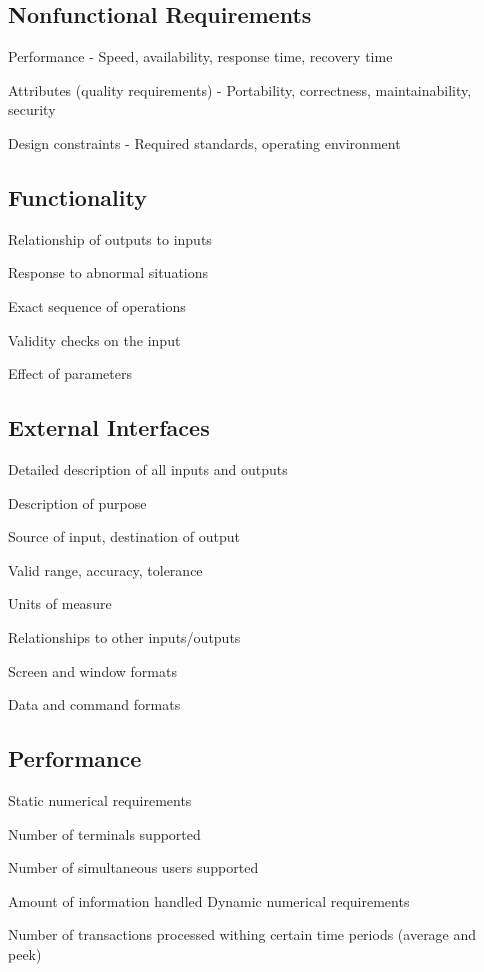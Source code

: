 \documentclass[10pt]{article}
\begin{document}
\subsection{Nonfunctional Requirements}
\enumstart
	\item Performance - Speed, availability, response time, recovery time
	\item Attributes (quality requirements) - Portability, correctness, maintainability, security
	\item Design constraints - Required standards, operating environment
\enumend

\subsection{Functionality}
\enumstart
	\item Relationship of outputs to inputs
	\item Response to abnormal situations
	\item Exact sequence of operations
	\item Validity checks on the input
	\item Effect of parameters
\enumend

\subsection{External Interfaces}
Detailed description of all inputs and outputs
\enumstart
	\item Description of purpose
	\item Source of input, destination of output
	\item Valid range, accuracy, tolerance
	\item Units of measure
	\item Relationships to other inputs/outputs
	\item Screen and window formats
	\item Data and command formats
\enumend

\subsection{Performance}
Static numerical requirements
\enumstart
	\item Number of terminals supported
	\item Number of simultaneous users supported
	\item Amount of information handled
\enumend
Dynamic numerical requirements
\enumstart
	\item Number of transactions processed withing certain time periods (average and peek)
\enumend
\end{document}
